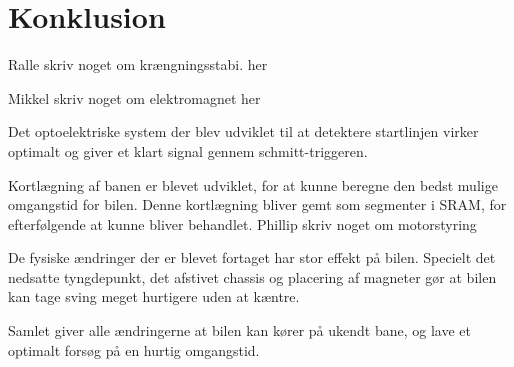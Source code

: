 
\section{Konklusion}
Ralle skriv noget om krængningsstabi. her

Mikkel skriv noget om elektromagnet her

Det optoelektriske system der blev udviklet til at detektere startlinjen virker
optimalt og giver et klart signal gennem schmitt-triggeren.

Kortlægning af banen er blevet udviklet, for at kunne beregne den bedst mulige omgangstid for bilen.
Denne kortlægning bliver gemt som segmenter i SRAM, for efterfølgende at kunne bliver behandlet.
Phillip skriv noget om motorstyring

De fysiske ændringer der er blevet fortaget har stor effekt på bilen. Specielt det nedsatte tyngdepunkt, det afstivet chassis og placering af magneter gør at bilen kan tage sving meget hurtigere uden at kæntre.

Samlet giver alle ændringerne at bilen kan kører på ukendt bane, og lave et optimalt forsøg på en hurtig omgangstid.
